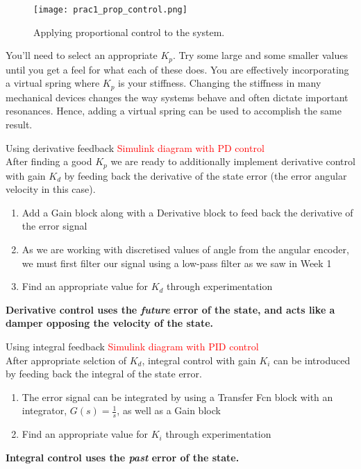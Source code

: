 \documentclass[9pt]{beamer-control}
\begin{document}
\begin{frame}
	\begin{figure}
		\centering
		\texttt{[image: prac1\_prop\_control.png]}
		\caption{Applying proportional control to the system.}
	\end{figure}
	You’ll need to select an appropriate $K_p.$ Try some large and some smaller values until you get a feel for what each of these does. You are effectively incorporating a virtual spring where $K_p$ is your stiffness. Changing the stiffness in many mechanical devices changes the way systems behave and often dictate important resonances. Hence, adding a virtual spring can be used to accomplish the same result.
\end{frame}




\begin{frame}{Using derivative feedback}
\textcolor{red}{Simulink diagram with PD control}\\
After finding a good $K_p$ we are ready to additionally implement derivative control with gain $K_d$ by feeding back the derivative of the state error (the error angular velocity in this case).

\begin{enumerate}
	\item Add a Gain block along with a Derivative block to feed back the derivative of the error signal
	\item As we are working with discretised values of angle from the angular encoder, we must first filter our signal using a low-pass filter as we saw in Week 1
	\item Find an appropriate value for $K_d$ through experimentation
\end{enumerate}

\textbf{Derivative control uses the \textit{future} error of the state, and acts like a damper opposing the velocity of the state.}
\end{frame}


\begin{frame}{Using integral feedback}
\textcolor{red}{Simulink diagram with PID control}\\
After appropriate selction of $K_d$, integral control with gain $K_i$ can be introduced by feeding back the integral of the state error. 

\begin{enumerate}
	\item The error signal can be integrated by using a Transfer Fcn block with an integrator, $G(s)=\tfrac{1}{s}$, as well as a Gain block
	\item Find an appropriate value for $K_i$ through experimentation
\end{enumerate}


\textbf{Integral control uses the \textit{past} error of the state.}
\end{frame}
\end{document}
